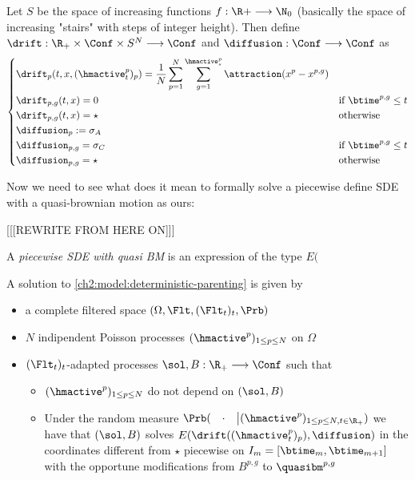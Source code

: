 \begin{definition}\label{ch3:formal-def-drift-diffus}
	Let $S$ be the space of \cadlag increasing functions $f:\R+ \longrightarrow \N_0$ (basically the space of increasing "stairs" with steps of integer height). Then define $\drift: \R_+ \times \Conf \times S^N \longrightarrow \Conf$ and $\diffusion: \Conf \longrightarrow \Conf$ as
\begin{equation}
\left\{
\begin{aligned}
&\drift_p(t,x,(\hmactive_t^p)_p) = \frac{1}{N} \sum _{p = 1}^{N} \sum_{g = 1}^{\hmactive_s^p} \attraction(x^p - x^{p,g})
	&&
\\
&\drift_{p,g}(t,x) = 0
	&& \text{if } \btime^{p,g} \leq t
\\
&\drift_{p,g}(t,x) = \star
	&& \text{otherwise}
\\
&\diffusion_p:= \sigma_A
&
\\
&\diffusion_{p,g} = \sigma_C
&& \text{if } \btime^{p,g} \leq t
\\
&\diffusion_{p,g} = \star
&& \text{otherwise}
\end{aligned}
\right.
\end{equation}
\end{definition}

Now we need to see what does it mean to formally solve a piecewise define SDE with a quasi-brownian motion as ours:

[[[REWRITE FROM HERE ON]]]


\begin{definition}
A \emph{piecewise SDE with quasi BM} is an expression of the type $E($
\end{definition}



\begin{definition}
A solution to \ref{ch2:model:deterministic-parenting} is given by
\begin{itemize}
\item a complete filtered space $(\Omega, \Flt, (\Flt_t)_t, \Prb)$
\item $N$ indipendent Poisson processes $(\hmactive^p)_{1\leq p\leq N}$ on $\Omega$
\item $(\Flt_t)_t$-adapted processes $\sol,B:\R_+ \longrightarrow \Conf$ such that 
	\begin{itemize}
	\item $(\hmactive^p)_{1\leq p\leq N}$ do not depend on $(\sol,B)$
	\item Under the random measure $\Prb(\quad\cdot\quad \big| (\hmactive^p)_{1\leq p\leq N, t\in\R_+})$ we have that $(\sol,B)$ solves $E(\drift((\hmactive_t^p)_p), \diffusion)$ in the coordinates different from $\star$ piecewise on $I_m=[\btime_m,\btime_{m+1}]$ with the opportune modifications from $B^{p,g}$ to $\quasibm^{p,g}$
	\end{itemize}
\end{itemize}
\end{definition}

